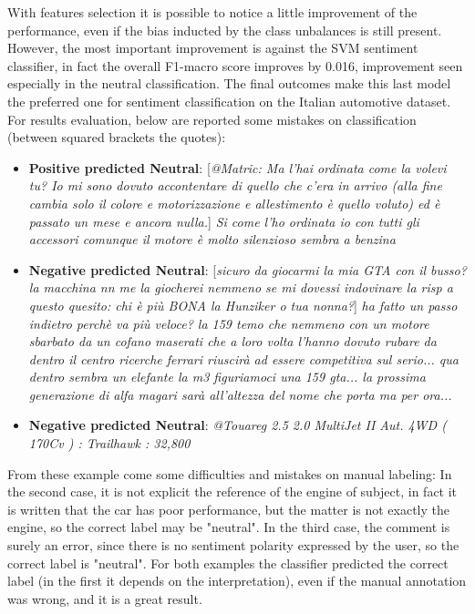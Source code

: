 With features selection it is possible to notice a little improvement of the performance, even if the bias inducted by the class unbalances is still present. However, the most important improvement is against the SVM sentiment classifier, in fact the overall F1-macro score improves by 0.016, improvement seen especially in the neutral classification. The final outcomes make this last model the preferred one for sentiment classification on the Italian automotive dataset.\\
For results evaluation, below are reported some mistakes on classification (between squared brackets the quotes):

\begin{itemize}
	\item \textbf{Positive predicted Neutral}: [\textit{@Matric: Ma l'hai ordinata come la volevi tu? Io mi sono dovuto accontentare di quello che c'era in arrivo (alla fine cambia solo il colore e motorizzazione e allestimento è quello voluto) ed è passato un mese e ancora nulla.}] \textit{Si come l'ho ordinata io con tutti gli accessori comunque il motore è molto silenzioso sembra a benzina}\\
	\item \textbf{Negative predicted Neutral}: [\textit{sicuro da giocarmi la mia GTA con il busso?la macchina nn me la giocherei nemmeno se mi dovessi indovinare la risp a questo quesito: chi è più BONA la Hunziker o tua nonna?}] \textit{ha fatto un passo indietro perchè va più veloce? la 159 temo che nemmeno con un motore sbarbato da un cofano maserati che a loro volta l'hanno dovuto rubare da dentro il centro ricerche ferrari riuscirà ad essere competitiva sul serio... qua dentro sembra un elefante la m3 figuriamoci una 159 gta... la prossima generazione di alfa magari sarà all'altezza del nome che porta ma per ora... }
	\item \textbf{Negative predicted Neutral}: \textit{@Touareg 2.5 2.0 MultiJet II Aut. 4WD ( 170Cv ) : Trailhawk : 32,800}
\end{itemize}

From these example come some difficulties and mistakes on manual labeling: In the second case, it is not explicit the reference of the engine of subject, in fact it is written that the car has poor performance, but the matter is not exactly the engine, so the correct label may be "neutral". In the third case, the comment is surely an error, since there is no sentiment polarity expressed by the user, so the correct label is "neutral". For both examples the classifier predicted the correct label (in the first it depends on the interpretation), even if the manual annotation was wrong, and it is a great result.



